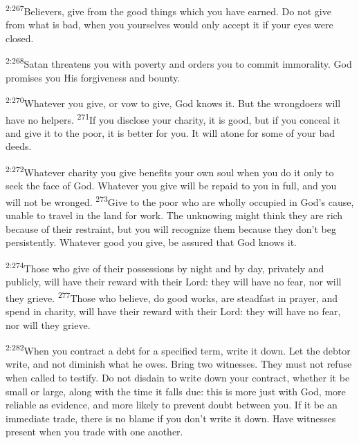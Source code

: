 \documentclass[openany,12pt,english]{book}
\newenvironment{para}{\par\pretolerance=100\tolerance=200\setlength{\emergencystretch}{0.6em}\relax}{\par}
\begin{document}
\begin{para}
    \textsuperscript{2:267}\thinspace{}Believers, give from the good things which you have earned. Do not give from what is bad, when you your\-selves would on\-ly ac\-cept it if your eyes were closed.
\end{para}

\begin{para}
    \textsuperscript{2:268}\thinspace{}Satan threatens you with pov\-er\-ty and orders you to com\-mit im\-mo\-ral\-i\-ty. God promises you His for\-give\-ness and boun\-ty.
\end{para}

\begin{para}
    \textsuperscript{2:270}\thinspace{}What\-ev\-er you give, or vow to give, God knows it. But the wrongdoers will have no helpers.
    \textsuperscript{271}\thinspace{}If you dis\-close your char\-i\-ty, it is good, but if you con\-ceal it and give it to the poor, it is bet\-ter for you. It will a\-tone for some of your bad deeds.
\end{para}

\begin{para}
    \textsuperscript{2:272}\thinspace{}What\-ev\-er char\-i\-ty you give benefits your own soul when you do it on\-ly to seek the face of God. What\-ev\-er you give will be repaid to you in full, and you will not be wronged.
    \textsuperscript{273}\thinspace{}Give to the poor who are whol\-ly occupied in God's cause, un\-a\-ble to trav\-el in the land for work. The un\-know\-ing might think they are rich be\-cause of their re\-straint, but you will rec\-og\-nize them be\-cause they don't beg per\-sist\-ent\-ly. What\-ev\-er good you give, be as\-sured that God knows it.
\end{para}

\begin{para}
    \textsuperscript{2:274}\thinspace{}Those who give of their possessions by night and by day, pri\-vate\-ly and pub\-lic\-ly, will have their re\-ward with their Lord: they will have no fear, nor will they grieve.
    \textsuperscript{277}\thinspace{}Those who be\-lieve, do good works, are stead\-fast in pray\-er, and spend in char\-i\-ty, will have their re\-ward with their Lord: they will have no fear, nor will they grieve.
\end{para}

\begin{para}
    \textsuperscript{2:282}\thinspace{}When you con\-tract a debt for a spec\-i\-fied term, write it down. Let the debt\-or write, and not di\-min\-ish what he owes. Bring two witnesses. They must not ref\-use when called to tes\-ti\-fy. Do not dis\-dain to write down your con\-tract, wheth\-er it be small or large, a\-long with the time it falls due: this is more just with God, more re\-li\-a\-ble as ev\-i\-dence, and more like\-ly to pre\-vent doubt be\-tween you. If it be an im\-me\-di\-ate trade, there is no blame if you don't write it down. Have witnesses pres\-ent when you trade with one an\-oth\-er.
\end{para}
\end{document}
